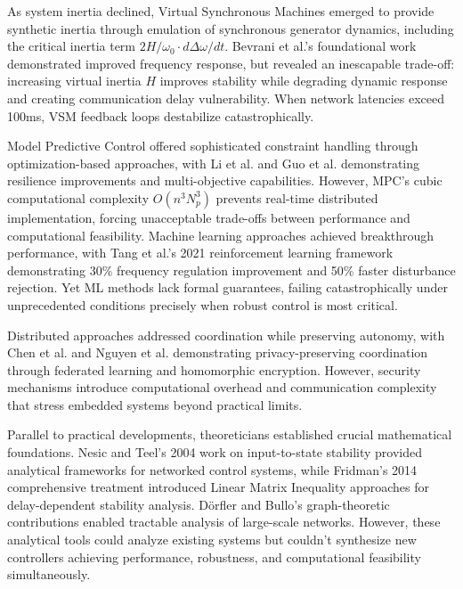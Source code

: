 \documentclass[12pt]{article}
\begin{document}
As system inertia declined, Virtual Synchronous Machines emerged to provide synthetic inertia through emulation of synchronous generator dynamics, including the critical inertia term $2H/\omega_0 \cdot d\Delta\omega/dt$. Bevrani et al.'s foundational work \cite{bevrani2014} demonstrated improved frequency response, but revealed an inescapable trade-off: increasing virtual inertia $H$ improves stability while degrading dynamic response and creating communication delay vulnerability. When network latencies exceed 100ms, VSM feedback loops destabilize catastrophically.

Model Predictive Control offered sophisticated constraint handling through optimization-based approaches, with Li et al. \cite{li2017} and Guo et al. \cite{guo2021} demonstrating resilience improvements and multi-objective capabilities. However, MPC's cubic computational complexity $O(n^3N_p^3)$ prevents real-time distributed implementation, forcing unacceptable trade-offs between performance and computational feasibility. Machine learning approaches achieved breakthrough performance, with Tang et al.'s 2021 reinforcement learning framework \cite{tang2021} demonstrating 30\% frequency regulation improvement and 50\% faster disturbance rejection. Yet ML methods lack formal guarantees, failing catastrophically under unprecedented conditions precisely when robust control is most critical.

Distributed approaches addressed coordination while preserving autonomy, with Chen et al. \cite{chen2021} and Nguyen et al. \cite{nguyen2022} demonstrating privacy-preserving coordination through federated learning and homomorphic encryption. However, security mechanisms introduce computational overhead and communication complexity that stress embedded systems beyond practical limits.


Parallel to practical developments, theoreticians established crucial mathematical foundations. Nesic and Teel's 2004 work \cite{nesic2004} on input-to-state stability provided analytical frameworks for networked control systems, while Fridman's 2014 comprehensive treatment \cite{fridman2014} introduced Linear Matrix Inequality approaches for delay-dependent stability analysis. Dörfler and Bullo's graph-theoretic contributions \cite{dorfler2013} enabled tractable analysis of large-scale networks. However, these analytical tools could analyze existing systems but couldn't synthesize new controllers achieving performance, robustness, and computational feasibility simultaneously.
\end{document}
